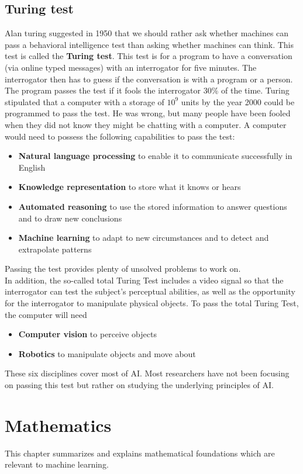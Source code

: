 \documentclass{report}
\begin{document}
\section{Turing test}
Alan turing suggested in 1950 that we should rather ask whether machines can pass a behavioral intelligence test than asking whether machines can think.
This test is called the {\bf Turing test}. This test is for a program to have a conversation (via online typed messages) with an interrogator for five minutes. The interrogator then has to guess if the conversation is with a program or a person. The program passes the test if it fools the interrogator 30\% of the time.
Turing stipulated that a computer with a storage of $10^9$ units by the year 2000 could be programmed to pass the test.
He was wrong, but many people have been fooled when they did not know they might be chatting with a computer.
A computer would need to possess the following capabilities to pass the test:
\begin{itemize}
\item {\bf Natural language processing} to enable it to communicate successfully in English
\item {\bf Knowledge representation} to store what it knows or hears
\item {\bf Automated reasoning} to use the stored information to answer questions and to draw new conclusions
\item {\bf Machine learning} to adapt to new circumstances and to detect and extrapolate patterns
\end{itemize}
Passing the test provides plenty of unsolved problems to work on.\\
In addition, the so-called {total Turing Test} includes a video signal so that the interrogator can test the subject's perceptual abilities, as well as the opportunity for the interrogator to manipulate physical objects.
To pass the total Turing Test, the computer will need
\begin{itemize}
\item {\bf Computer vision} to perceive objects
\item {\bf Robotics} to manipulate objects and move about
\end{itemize}
These six disciplines cover most of AI. Most researchers have not been focusing on passing this test but rather on studying the underlying principles of AI.



\chapter{Mathematics}
This chapter summarizes and explains mathematical foundations which are relevant to machine learning.
\end{document}
